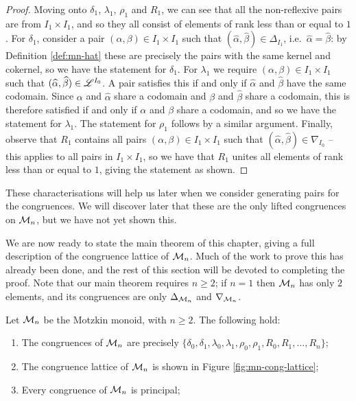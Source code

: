 \begin{proposition}
\begin{proof}
    Moving onto $\delta_1$, $\lambda_1$, $\rho_1$ and $R_1$, we can see that all
    the non-reflexive pairs are from $I_1 \times I_1$, and so they all consist
    of elements of rank less than or equal to $1$.  For $\delta_1$, consider a
    pair $(\alpha,\beta) \in I_1 \times I_1$ such that
    $(\widehat\alpha, \widehat\beta) \in \Delta_{I_1}$,
    i.e.~$\widehat\alpha = \widehat\beta$: by Definition \ref{def:mn-hat} these
    are precisely the pairs with the same kernel and cokernel, so we have the
    statement for $\delta_1$.  For $\lambda_1$ we require
    $(\alpha,\beta) \in I_1 \times I_1$ such that
    $(\widehat\alpha, \widehat\beta) \in \mathscr{L}^{I_0}$.  A pair satisfies this if
    and only if $\widehat\alpha$ and $\widehat\beta$ have the same codomain.
    Since $\alpha$ and $\widehat\alpha$ share a codomain and $\beta$ and
    $\widehat\beta$ share a codomain, this is therefore satisfied if and only if
    $\alpha$ and $\beta$ share a codomain, and so we have the statement for
    $\lambda_1$.  The statement for $\rho_1$ follows by a similar argument.
    Finally, observe that $R_1$ contains all pairs
    $(\alpha,\beta) \in I_1 \times I_1$ such that
    $(\widehat\alpha,\widehat\beta) \in \nabla_{I_0}$ -- this applies to all
    pairs in $I_1 \times I_1$, so we have that $R_1$ unites all elements of rank
    less than or equal to $1$, giving the statement as shown.
  \end{proof}
\end{proposition}

These characterisations will help us later when we consider generating pairs for
the congruences.
We will discover later that these are the only lifted congruences on $\mathcal{M}_n$,
but we have not yet shown this.

We are now ready to state the main theorem of this chapter, giving a full
description of the congruence lattice of $\mathcal{M}_n$.  Much of the work to prove
this has already been done, and the rest of this section will be devoted to
completing the proof.  Note that our main theorem requires $n \geq 2$; if
$n = 1$ then $\mathcal{M}_n$ has only $2$ elements, and its congruences are only
$\Delta_{\mathcal{M}_n}$ and $\nabla_{\mathcal{M}_n}$.

\begin{theorem}
  \label{thm:mn-congs}
  Let $\mathcal{M}_n$ be the Motzkin monoid, with $n \geq 2$.  The following hold:
  \begin{enumerate}[\rm(i)]
  \item The congruences of $\mathcal{M}_n$ are precisely
    $\{\delta_0, \delta_1, \lambda_0, \lambda_1, \rho_0, \rho_1, R_0, R_1,
    \ldots, R_n\}$;
  \item The congruence lattice of $\mathcal{M}_n$ is shown in Figure
    \ref{fig:mn-cong-lattice};
  \item Every congruence of $\mathcal{M}_n$ is principal;
  \end{enumerate}
\end{theorem}

